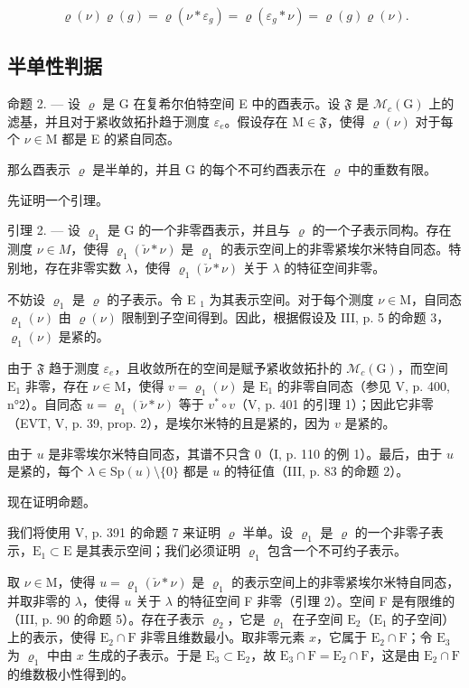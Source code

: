 \[
\varrho (\nu) \varrho (g) = \varrho (\nu * \varepsilon_ {g}) = \varrho (\varepsilon_ {g} * \nu) = \varrho (g) \varrho (\nu).
\]

\subsection{半单性判据}

命题 2. --- 设 \(\varrho\) 是 G 在复希尔伯特空间 E 中的酉表示。设 \(\mathfrak{F}\) 是 \(\mathcal{M}_{c}(\mathrm{G})\) 上的滤基，并且对于紧收敛拓扑趋于测度 \(\varepsilon_{e}\)。假设存在 \(\mathrm{M} \in \mathfrak{F}\)，使得 \(\varrho(\nu)\) 对于每个 \(\nu \in \mathrm{M}\) 都是 E 的紧自同态。

那么酉表示 \(\varrho\) 是半单的，并且 G 的每个不可约酉表示在 \(\varrho\) 中的重数有限。

先证明一个引理。

引理 2. --- 设 \(\varrho_{1}\) 是 G 的一个非零酉表示，并且与 \(\varrho\) 的一个子表示同构。存在测度 \(\nu \in M\)，使得 \(\varrho_{1}(\check{\nu} * \nu)\) 是 \(\varrho_{1}\) 的表示空间上的非零紧埃尔米特自同态。特别地，存在非零实数 \(\lambda\)，使得 \(\varrho_{1}(\check{\nu} * \nu)\) 关于 \(\lambda\) 的特征空间非零。

不妨设 \(\varrho_{1}\) 是 \(\varrho\) 的子表示。令 E \(_{1}\) 为其表示空间。对于每个测度 \(\nu \in \mathrm{M}\)，自同态 \(\varrho_{1}(\nu)\) 由 \(\varrho(\nu)\) 限制到子空间得到。因此，根据假设及 III, p. 5 的命题 3，\(\varrho_{1}(\nu)\) 是紧的。

由于 \(\mathfrak{F}\) 趋于测度 \(\varepsilon_{e}\)，且收敛所在的空间是赋予紧收敛拓扑的 \(\mathcal{M}_{c}(\mathrm{G})\)，而空间 \(\mathrm{E}_{1}\) 非零，存在 \(\nu\in\mathrm{M}\)，使得 \(v=\varrho_{1}(\nu)\) 是 \(\mathrm{E}_{1}\) 的非零自同态（参见 V, p. 400, n°2）。自同态 \(u=\varrho_{1}(\check{\nu}*\nu)\) 等于 \(v^{*}\circ v\)（V, p. 401 的引理 1）；因此它非零（EVT, V, p. 39, prop. 2），是埃尔米特的且是紧的，因为 \(v\) 是紧的。

由于 \(u\) 是非零埃尔米特自同态，其谱不只含 0（I, p. 110 的例 1）。最后，由于 \(u\) 是紧的，每个 \(\lambda \in \mathrm{Sp}(u)\setminus\{0\}\) 都是 \(u\) 的特征值（III, p. 83 的命题 2）。

现在证明命题。

我们将使用 V, p. 391 的命题 7 来证明 \(\varrho\) 半单。设 \(\varrho_{1}\) 是 \(\varrho\) 的一个非零子表示，\(\mathrm{E}_{1} \subset \mathrm{E}\) 是其表示空间；我们必须证明 \(\varrho_{1}\) 包含一个不可约子表示。

取 \(\nu \in \mathrm{M}\)，使得 \(u = \varrho_{1}(\check{\nu}*\nu)\) 是 \(\varrho_{1}\) 的表示空间上的非零紧埃尔米特自同态，并取非零的 \(\lambda\)，使得 \(u\) 关于 \(\lambda\) 的特征空间 F 非零（引理 2）。空间 F 是有限维的（III, p. 90 的命题 5）。存在子表示 \(\varrho_{2}\)，它是 \(\varrho_{1}\) 在子空间 \(\mathrm{E}_{2}\)（\(\mathrm{E}_{1}\) 的子空间）上的表示，使得 \(\mathrm{E}_{2} \cap \mathrm{F}\) 非零且维数最小。取非零元素 \(x\)，它属于 \(\mathrm{E}_{2} \cap \mathrm{F}\)；令 \(\mathrm{E}_{3}\) 为 \(\varrho_{1}\) 中由 \(x\) 生成的子表示。于是 \(\mathrm{E}_{3} \subset \mathrm{E}_{2}\)，故 \(\mathrm{E}_{3} \cap \mathrm{F} = \mathrm{E}_{2} \cap \mathrm{F}\)，这是由 \(\mathrm{E}_{2} \cap \mathrm{F}\) 的维数极小性得到的。


